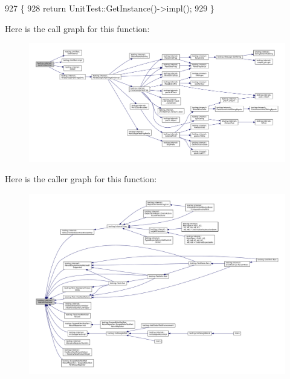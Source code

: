 \begin{DoxyCode}
927                                        \{
928   \textcolor{keywordflow}{return} UnitTest::GetInstance()->impl();
929 \}
\end{DoxyCode}
Here is the call graph for this function\+:
\nopagebreak
\begin{figure}[H]
\begin{center}
\leavevmode
\includegraphics[width=350pt]{namespacetesting_1_1internal_a9bd0caf5d16512de38b39599c13ee634_cgraph}
\end{center}
\end{figure}
Here is the caller graph for this function\+:
\nopagebreak
\begin{figure}[H]
\begin{center}
\leavevmode
\includegraphics[width=350pt]{namespacetesting_1_1internal_a9bd0caf5d16512de38b39599c13ee634_icgraph}
\end{center}
\end{figure}
\mbox{\label{namespacetesting_1_1internal_a20f5584732e44a368e7acf295b639319}} 
